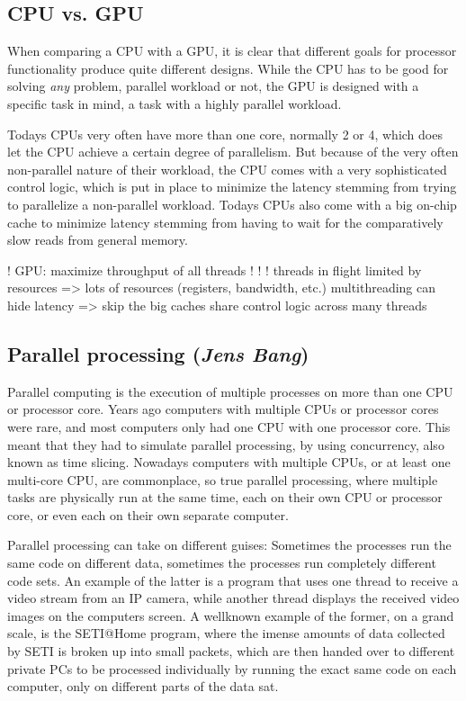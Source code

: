 \subsection{CPU vs. GPU}

When comparing a CPU with a GPU, it is clear that different goals for processor functionality produce quite different designs. While the CPU has to be good for solving \emph{any} problem, parallel workload or not, the GPU is designed with a specific task in mind, a task with a highly parallel workload.

Todays CPUs very often have more than one core, normally 2 or 4, which does let the CPU achieve a certain degree of parallelism. But because of the very often non-parallel nature of their workload, the CPU comes with a very sophisticated control logic, which is put in place to minimize the latency stemming from trying to parallelize a non-parallel workload. Todays CPUs also come with a big on-chip cache to minimize latency stemming from having to wait for the comparatively slow reads from general memory.



!   GPU: maximize throughput of all threads
!  
!   !  
threads in flight limited by resources => lots of resources (registers, bandwidth, etc.)
multithreading can hide latency => skip the big caches share control logic across many threads

\subsection{Parallel processing (\textit{Jens Bang})}

Parallel computing is the execution of multiple processes on more than one CPU or processor core. Years ago computers with multiple CPUs or processor cores were rare, and most computers only had one CPU with one processor core. This meant that they had to simulate parallel processing, by using concurrency, also known as time slicing. Nowadays computers with multiple CPUs, or at least one multi-core CPU, are commonplace, so true parallel processing, where multiple tasks are physically run at the same time, each on their own CPU or processor core, or even each on their own separate computer.

Parallel processing can take on different guises: Sometimes the processes run the same code on different data, sometimes the processes run completely different code sets. An example of the latter is a program that uses one thread to receive a video stream from an IP camera, while another thread displays the received video images on the computers screen. A wellknown example of the former, on a grand scale, is the SETI@Home program, where the imense amounts of data collected by SETI is broken up into small packets, which are then handed over to different private PCs to be processed individually by running the exact same code on each computer, only on different parts of the data sat.


